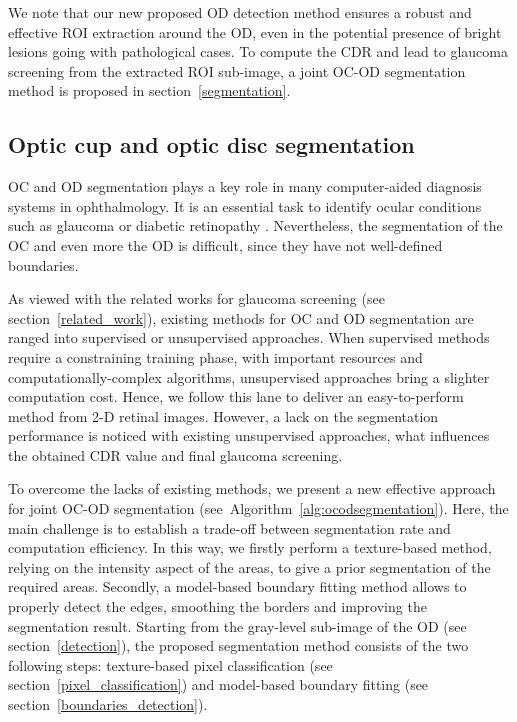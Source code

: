 \bigbreak

We note that our new proposed OD detection method ensures a robust and effective ROI extraction around the OD, even in the potential presence of bright lesions going with pathological cases. 
To compute the CDR and lead to glaucoma screening from the extracted ROI sub-image, a joint OC-OD segmentation method is proposed in \mbox{section \ref{segmentation}}.


\subsection{\label{segmentation}Optic cup and optic disc segmentation}



OC and OD segmentation plays a key role in many computer-aided diagnosis systems in ophthalmology. It is an essential task to identify ocular conditions such as glaucoma or diabetic retinopathy \citep{cheng,nugraha}.
Nevertheless, the segmentation of the OC and even more the OD is difficult, since they have not well-defined boundaries.

As viewed with the related works for glaucoma screening (see \mbox{section \ref{related_work}}), existing methods for OC and OD segmentation are ranged into supervised or unsupervised approaches.
When supervised methods require a constraining training phase, with important resources and computationally-complex algorithms, unsupervised approaches bring a slighter computation cost. Hence, we follow this lane to deliver an easy-to-perform method from 2-D retinal images.
However,  a lack on the segmentation performance is noticed with existing unsupervised approaches, what influences the obtained CDR value and final glaucoma screening. 

To overcome the lacks of existing methods, we present a new effective approach for joint OC-OD segmentation \mbox{(see Algorithm~\ref{alg:ocodsegmentation})}. Here, the main challenge is to establish a trade-off between segmentation rate and computation efficiency. In this way, we firstly perform a texture-based method, relying on the intensity aspect of the areas, to give a prior segmentation of the required areas. Secondly, a model-based boundary fitting method allows to properly detect the edges, smoothing the borders and improving the segmentation result.
Starting from the gray-level sub-image of the OD (see \mbox{section \ref{detection}}), the proposed segmentation method consists of the two following steps: texture-based pixel classification (see \mbox{section \ref{pixel_classification}}) and model-based boundary fitting (see \mbox{section \ref{boundaries_detection}}).

